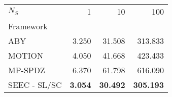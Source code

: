 \begin{tabular}{lrrr}
\toprule
$N_S$ & 1 & 10 & 100 \\
Framework &  &  &  \\
\midrule
ABY~\cite{DSZ15} & 3.250 & 31.508 & 313.833 \\
MOTION~\cite{BDST22} & 4.050 & 41.668 & 423.433 \\
MP-SPDZ~\cite{CCS:Keller20} & 6.370 & 61.798 & 616.090 \\
SEEC - SL/SC & \bfseries 3.054 & \bfseries 30.492 & \bfseries 305.193 \\
\bottomrule
\end{tabular}
